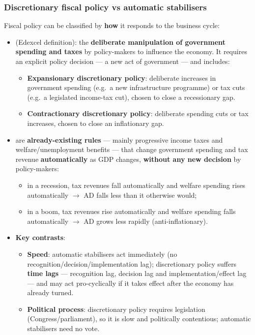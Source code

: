 \subsubsection*{Discretionary fiscal policy vs automatic stabilisers}
Fiscal policy can be classified by \textbf{how} it responds to the business cycle:
\begin{itemize}
  \item {} (Edexcel definition): the \textbf{deliberate manipulation of government spending and taxes} by policy-makers to influence the economy. It requires an explicit policy decision --- a new act of government --- and includes:
  \begin{itemize}
    \item \textbf{Expansionary discretionary policy}: deliberate increases in government spending (e.g.\ a new infrastructure programme) or tax cuts (e.g.\ a legislated income-tax cut), chosen to close a recessionary gap.
    \item \textbf{Contractionary discretionary policy}: deliberate spending cuts or tax increases, chosen to close an inflationary gap.
  \end{itemize}
  \item {} are \textbf{already-existing rules} --- mainly progressive income taxes and welfare/unemployment benefits --- that change government spending and tax revenue \textbf{automatically} as GDP changes, \textbf{without any new decision} by policy-makers:
  \begin{itemize}
    \item in a recession, tax revenues fall automatically and welfare spending rises automatically $\to$ AD falls less than it otherwise would;
    \item in a boom, tax revenues rise automatically and welfare spending falls automatically $\to$ AD grows less rapidly (anti-inflationary).
  \end{itemize}
  \item \textbf{Key contrasts}:
  \begin{itemize}
    \item \textbf{Speed}: automatic stabilisers act immediately (no recognition/decision/implementation lag); discretionary policy suffers \textbf{time lags} --- recognition lag, decision lag and implementation/effect lag --- and may act pro-cyclically if it takes effect after the economy has already turned.
    \item \textbf{Political process}: discretionary policy requires legislation (Congress/parliament), so it is slow and politically contentious; automatic stabilisers need no vote.

\end{itemize}
\end{itemize}
